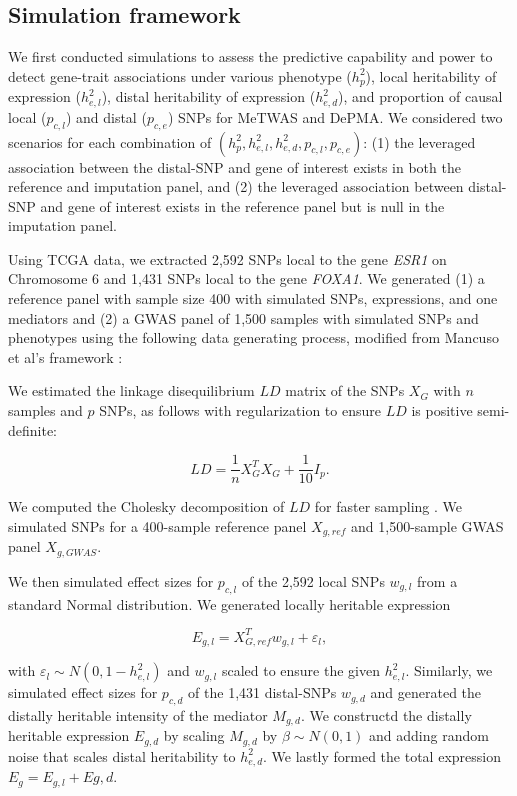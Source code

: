 \subsection{Simulation framework}

We first conducted simulations to assess
the predictive capability
and power to detect
gene-trait associations
under various phenotype ($h^2_p$),
local heritability of expression ($h^2_{e,l}$),
distal heritability of expression ($h^2_{e,d}$),
and proportion of causal local ($p_{c,l}$)
and distal ($p_{c,e}$) SNPs
for MeTWAS and DePMA.
We considered two scenarios for each
combination of $(h^2_p, h^2_{e,l}, h^2_{e,d}, p_{c,l},
p_{c,e})$: (1) the leveraged association
between the distal-SNP and gene of interest
exists in both the reference
and imputation panel, and (2) the leveraged association 
between distal-SNP and gene of interest
exists in the reference panel but is null
in the imputation panel.

Using TCGA data, we 
extracted 2,592 SNPs local to
the gene \emph{ESR1} 
on Chromosome 6 and 1,431 SNPs
local to the gene \emph{FOXA1}.
We generated (1) a reference panel with sample
size 400 with
simulated SNPs, expressions,
and one mediators 
and (2) a GWAS panel of
1,500 samples with simulated SNPs
and phenotypes using the following data
generating process, modified
from Mancuso et al's framework
\cite{Mancuso2019ProbabilisticStudies}:

We estimated the linkage disequilibrium $LD$
matrix of the SNPs $X_G$ with $n$
samples and $p$ SNPs, as follows
with regularization to ensure $LD$ is positive semi-definite:

$$LD = \frac{1}{n}X_G^TX_G + \frac{1}{10}I_p.$$ 

We computed the Cholesky decomposition of
$LD$ for faster sampling
\cite{Mancuso2019ProbabilisticStudies}.
We simulated SNPs for a 400-sample
reference panel $X_{g,ref}$ and 
1,500-sample GWAS panel $X_{g,GWAS}$.

We then simulated
effect sizes for $p_{c,l}$ of
the 2,592 local
SNPs $w_{g,l}$ 
from a standard Normal distribution.
We generated locally heritable
expression 

$$E_{g,l} = X_{G,ref}^Tw_{g,l} + \varepsilon_l,$$

with $\varepsilon_l \sim N(0,1-h^2_{e,l})$
and $w_{g,l}$ scaled to ensure the given $h^2_{e,l}$.
Similarly, we simulated effect sizes
for $p_{c,d}$ of the 1,431 distal-SNPs
$w_{g,d}$ and generated the distally heritable
intensity of the mediator $M_{g,d}$. We constructd
the distally heritable expression $E_{g,d}$
by scaling $M_{g,d}$ by $\beta \sim N(0,1)$ and adding random noise
that scales distal heritability to $h^2_{e,d}$.
We lastly formed the total expression $E_g = E_{g,l} + E{g,d}$.

